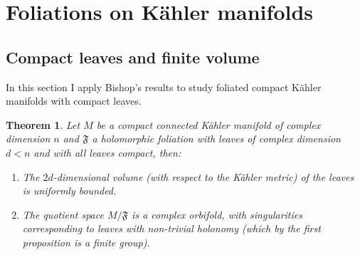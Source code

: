 \documentclass[12pt,twoside,a4paper]{report}
\newtheorem{theorem}{Theorem}[section]
\begin{document}
\section{Foliations on Kähler manifolds}
\subsection{Compact leaves and finite volume}
\noindent In this section I apply Bishop's results to study foliated compact Kähler manifolds with compact leaves.
\begin{theorem}\label{kahlerEMS}
        Let $M$ be a compact connected Kähler manifold
        of complex dimension $n$ and $\mathfrak{F}$ a holomorphic foliation
        with leaves of complex dimension $d<n$ and with all leaves compact,
        then:
\begin{enumerate}
        \item[1] The $2d$-dimensional volume (with
                respect to the Kähler metric) of the leaves is uniformly
                bounded.
        \item[2] The quotient space $M/\mathfrak{F}$ is a complex orbifold, with singularities corresponding to leaves
                with non-trivial holonomy (which by the first proposition is a finite group).
\end{enumerate}
\end{theorem}
\end{document}
